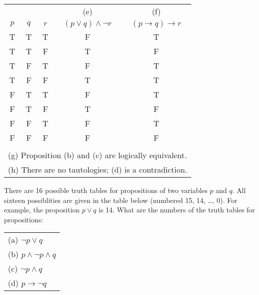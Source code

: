 \documentclass[12pt]{exam}
\begin{document}
\begin{questions}
\begin{solution}
    \begin{tabular}{|ccc|c|c|}
    \hline
      & & & (e) & (f) \\
     $p$ & $q$ & $r$ & $(p \vee q) \wedge \neg r$ & $(p \rightarrow q) \rightarrow r$ \\
     \hline
     T & T & T & F & T \\
     T & T & F & T & F \\
     T & F & T & F & T \\
     T & F & F & T & T \\
     F & T & T & F & T \\
     F & T & F & T & F \\
     F & F & T & F & T \\
     F & F & F & F & F \\
     \multicolumn{5}{|c|}{} \\
     \multicolumn{5}{|l|}{(g) Proposition (b) and (c) are logically equivalent.} \\
     \multicolumn{5}{|l|}{(h) There are no tautologies; (d) is a contradiction.} \\
    \hline
    \end{tabular}
   \end{solution}


\question There are 16 possible truth tables for propositions of two variables $p$ and $q$.  All sixteen possiblities are given in the table below (numbered 15, 14, \ldots, 0).  For example, the proposition $p \vee q$ is 14. What are the numbers of the truth tables for propositions:\\
 \begin{tabular}{l}
    (a) $\neg p \vee q$ \\
    (b) $p \wedge \neg p \wedge q$ \\
    (c) $\neg p \wedge q $ \\
    (d) $p \rightarrow \neg q$ \\
 \end{tabular}


\end{questions}
\end{document}
